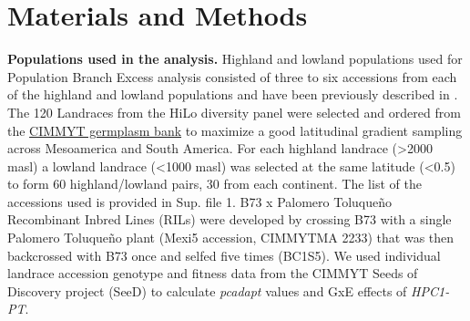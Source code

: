 \documentclass[9pt,twocolumn,twoside,lineno]{BioRxiv}
\begin{document}

\section{Materials and Methods}
\label{sec:materials:methods}
\textbf{Populations used in the analysis.} 
Highland and lowland populations used for Population Branch Excess analysis consisted of three to six accessions from each of the highland and lowland populations and have been previously described in \cite{Wang2020-mp, Wang2017-bc}. 
The 120 Landraces from the HiLo diversity panel were selected and ordered from the \href{http://mgb.cimmyt.org/gringlobal/search.aspx}{CIMMYT germplasm bank} to maximize a good latitudinal gradient sampling across Mesoamerica and South America. 
For each highland landrace (>2000 masl) a lowland landrace (<1000 masl) was selected at the same latitude (<0.5\degree) to form 60 highland/lowland pairs, 30 from each continent. 
The list of the accessions used is provided in Sup. file 1.   
B73 x Palomero Toluqueño Recombinant Inbred Lines (RILs) were developed by crossing B73 with a single Palomero Toluqueño plant (Mexi5 accession, CIMMYTMA 2233) that was then backcrossed with B73 once and selfed five times (BC1S5).  
We used  individual landrace accession genotype and fitness data from the CIMMYT Seeds of Discovery project (SeeD) \cite{Gates2019-xu} to calculate \textit{pcadapt} \cite{Luu2017-ws} values and GxE effects of \textit{HPC1-PT}.
\end{document}
